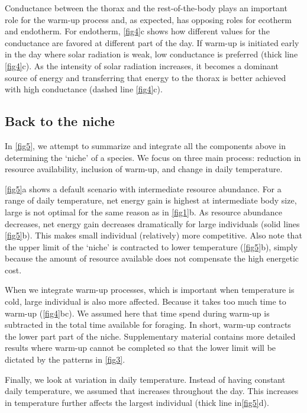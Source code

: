 Conductance between the thorax and the rest-of-the-body plays an important role for the warm-up process and, as expected, has opposing roles for ecotherm and endotherm.
For endotherm, \cref{fig4}c shows how different values for the conductance are favored at different part of the day.
If warm-up is initiated early in the day where solar radiation is weak, low conductance is preferred (thick line \cref{fig4}c).
As the intensity of solar radiation increases, it becomes a dominant source of energy and transferring that energy to the thorax is better achieved with high conductance (dashed line \cref{fig4}c).

\subsection*{Back to the niche}
In \cref{fig5}, we attempt to summarize and integrate all the components above in determining the `niche' of a species.
We focus on three main process: reduction in resource availability, inclusion of warm-up, and change in daily temperature.

\cref{fig5}a shows a default scenario with intermediate resource abundance.
For a range of daily temperature, net energy gain is highest at intermediate body size, large is not optimal for the same reason as in \cref{fig1}b.
As resource abundance decreases, net energy gain decreases dramatically for large individuals (solid lines \cref{fig5}b).
This makes small individual (relatively) more competitive.
Also note that the upper limit of the `niche' is contracted to lower temperature (\cref{fig5}b), simply because the amount of resource available does not compensate the high energetic cost.

When we integrate warm-up processes, which is important when temperature is cold, large individual is also more affected.
Because it takes too much time to warm-up (\cref{fig4}bc).
We assumed here that time spend during warm-up is subtracted in the total time available for foraging.
In short, warm-up contracts the lower part part of the niche.
Supplementary material contains more detailed results where warm-up cannot be completed so that the lower limit will be dictated by the patterns in \cref{fig3}.

Finally, we look at variation in daily temperature.
Instead of having constant daily temperature, we assumed that increases throughout the day.
This increases in temperature further affects the largest individual (thick line in\cref{fig5}d).

